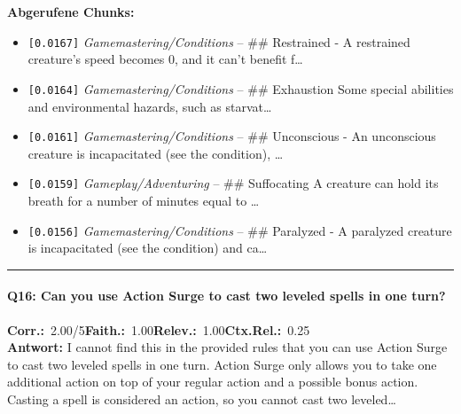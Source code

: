 \noindent\textbf{Abgerufene Chunks:}
\begin{itemize}[noitemsep, topsep=2pt]
  \item[\textbf{\#1}] \texttt{[0.0167]} \textit{Gamemastering/Conditions} -- \#\# Restrained  - A restrained creature's speed becomes 0, and it can't benefit f\ldots
  \item[\textbf{\#2}] \texttt{[0.0164]} \textit{Gamemastering/Conditions} -- \#\# Exhaustion  Some special abilities and environmental hazards, such as starvat\ldots
  \item[\textbf{\#3}] \texttt{[0.0161]} \textit{Gamemastering/Conditions} -- \#\# Unconscious  - An unconscious creature is incapacitated (see the condition), \ldots
  \item[\textbf{\#4}] \texttt{[0.0159]} \textit{Gameplay/Adventuring} -- \#\# Suffocating  A creature can hold its breath for a number of minutes equal to \ldots
  \item[\textbf{\#5}] \texttt{[0.0156]} \textit{Gamemastering/Conditions} -- \#\# Paralyzed  - A paralyzed creature is incapacitated (see the condition) and ca\ldots
\end{itemize}
\vspace{4pt}
\hrule
\vspace{6pt}

\paragraph{Q16: Can you use Action Surge to cast two leveled spells in one turn?}
\noindent \textbf{Corr.:}~2.00/5\quad \textbf{Faith.:}~1.00\quad \textbf{Relev.:}~1.00\quad \textbf{Ctx.Rel.:}~0.25\\

\noindent\textbf{Antwort:} I cannot find this in the provided rules that you can use Action Surge to cast two leveled spells in one turn. Action Surge only allows you to take one additional action on top of your regular action and a possible bonus action. Casting a spell is considered an action, so you cannot cast two leveled\ldots

